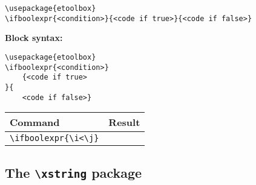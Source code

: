 \documentclass[12pt]{article}
\renewcommand{\i}{1}
\renewcommand{\j}{2}
\renewcommand{\k}{-1}
\newcommand{\x}{1.1cm}
\newcommand{\y}{2pt}
\begin{document}
	\begin{lstlisting}
\usepackage{etoolbox}
\ifboolexpr{<condition>}{<code if true>}{<code if false>}
	\end{lstlisting}
	\noindent\textbf{Block syntax:}
	\begin{lstlisting}
\usepackage{etoolbox}
\ifboolexpr{<condition>}
	{<code if true>
}{
	<code if false>}
	\end{lstlisting}
	\begin{center}
		\begin{tabular}{l|c}
			\hline
			\textbf{Command} & \textbf{Result} \\
			\hline
			\verb|\ifboolexpr{\i<\j}| &  \\ %
			\hline
		\end{tabular}
	\end{center}


\subsection{The \texttt{\textbackslash xstring} package}
\end{document}

